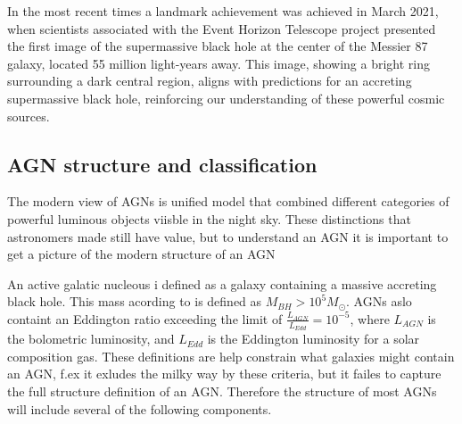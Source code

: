 \documentclass{article}
\begin{document}
In the most recent times a landmark achievement was achieved in March 2021, when scientists associated with the Event Horizon Telescope project 
presented the first image of the supermassive black hole at the center of the Messier 87 galaxy, located 55 million light-years away.
This image, showing a bright ring surrounding a dark central region, aligns with predictions for an accreting supermassive black hole, 
reinforcing our understanding of these powerful cosmic sources.



\subsection{AGN structure and classification}


The modern view of AGNs is  unified model that combined different categories of powerful luminous objects viisble in the night sky.
These distinctions that astronomers made still
have value, but to understand an AGN it is important to get a picture of the modern structure of an AGN

An active galatic nucleous i defined as a galaxy containing a massive accreting black hole. This mass acording to \cite{Netzer_2015} 
is defined as $M_{BH} > 10^5 M_\odot$. AGNs aslo containt an Eddington ratio exceeding
the limit of $\frac{L_{AGN}}{L_{Edd}} = 10^{-5}$, where $L_{AGN}$ is the bolometric luminosity, and $L_{Edd}$ is the Eddington luminosity for a solar 
composition gas. These definitions are help constrain what galaxies might contain an AGN, f.ex it exludes the milky way 
by these criteria, but it failes to capture the full structure definition of an AGN. 
Therefore the structure of most AGNs will include several of the following components. 
\end{document}
